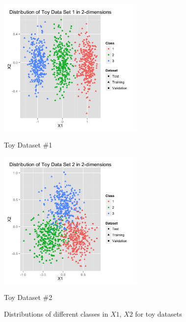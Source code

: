 \documentclass[10pt]{article}
\begin{document}
\begin{figure}[ht]
	\centering
	\begin{minipage}[b]{.48\linewidth}
		\includegraphics[width=1\linewidth, height=2.7in]{t1dist.jpg}
		\caption*{Toy Dataset \#1}
	\end{minipage}
	\begin{minipage}[b]{.48\linewidth}
		\includegraphics[width=1\linewidth, height=2.7in]{t2dist.jpg}
		\caption*{Toy Dataset \#2}
	\end{minipage}
	\caption{Distributions of different classes in $X1$, $X2$ for toy datasets}
\end{figure}
\end{document}

